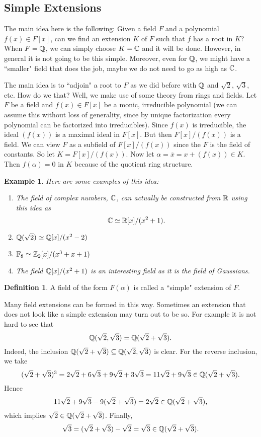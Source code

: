 \documentclass[12pt]{article}
\theoremstyle{plain}
\newtheorem{example}{Example}
\theoremstyle{definition}
\newtheorem{definition}{Definition}
\theoremstyle{remark}
\begin{document}
\subsection{Simple Extensions}
The main idea here is the following: Given a field $F$ and a polynomial $f(x) \in F[x]$, can we find an extension $K$ of $F$ such that $f$ has a root in $K$? When $F=\mathbb{Q}$, we can simply choose $K=\mathbb{C}$ and it will be done. However, in general it is not going to be this simple. Moreover, even for $\mathbb{Q}$, we might have a ``smaller" field that does the job, maybe we do not need to go as high as $\mathbb{C}$.

The main idea is to ``adjoin" a root to $F$ as we did before with $\mathbb{Q}$ and $\sqrt{2}$, $\sqrt{3}$, etc. How do we that? Well, we make use of some theory from rings and fields. Let $F$ be a field and $f(x)\in F[x]$ be a monic, irreducible polynomial (we can assume this without loss of generality, since by unique factorization every polynomial can be factorized into irreducibles). Since $f(x)$ is irreducible, the ideal $(f(x))$ is a maximal ideal in $F[x]$. But then $F[x]/(f(x))$ is a field. We can view $F$ as a subfield of $F[x]/(f(x))$ since the $F$ is the field of constants. So let $K=F[x]/(f(x))$. Now let $\alpha = \overline{x}=x+(f(x))\in K$. Then $f(\alpha)=0$ in $K$ because of the quotient ring structure.
\begin{example}
Here are some examples of this idea:
\begin{enumerate}
    \item The field of complex numbers, $\mathbb{C}$, can actually be constructed from $\mathbb{R}$ using this idea as
    $$\mathbb{C}\simeq \mathbb{R}[x]/(x^2+1).$$
    \item $\mathbb{Q}(\sqrt{2})\simeq \mathbb{Q}[x]/(x^2-2)$
    \item $\mathbb{F}_8\simeq \mathbb{Z}_2[x]/(x^3+x+1)$
    \item The field $\mathbb{Q}[x]/(x^2+1)$ is an interesting field as it is the field of Gaussians.
\end{enumerate}
\end{example}

\begin{definition}
A field of the form $F(\alpha)$ is called a ``simple" extension of $F$.
\end{definition}
Many field extensions can be formed in this way. Sometimes an extension that does not look like a simple extension may turn out to be so. For example it is not hard to see that
$$\mathbb{Q}(\sqrt{2}, \sqrt{3}) =\mathbb{Q}(\sqrt{2}+\sqrt{3}).$$
Indeed, the inclusion $\mathbb{Q}(\sqrt{2}+\sqrt{3}) \subseteq \mathbb{Q}(\sqrt{2}, \sqrt{3})$ is clear. For the reverse inclusion,
we take
$$(\sqrt{2}+\sqrt{3})^3 = 2\sqrt{2}+6\sqrt{3}+9\sqrt{2}+3\sqrt{3} = 11\sqrt{2}+9\sqrt{3} \in \mathbb{Q}(\sqrt{2}+\sqrt{3}).$$
Hence
$$11\sqrt{2}+9\sqrt{3}-9(\sqrt{2}+\sqrt{3}) = 2\sqrt{2}\in \mathbb{Q}(\sqrt{2}+\sqrt{3}),$$
which implies $\sqrt{2} \in \mathbb{Q}(\sqrt{2}+\sqrt{3})$.
Finally,
$$\sqrt{3}=(\sqrt{2}+\sqrt{3})-\sqrt{2} = \sqrt{3}\in \mathbb{Q}(\sqrt{2}+\sqrt{3}).$$
\end{document}
